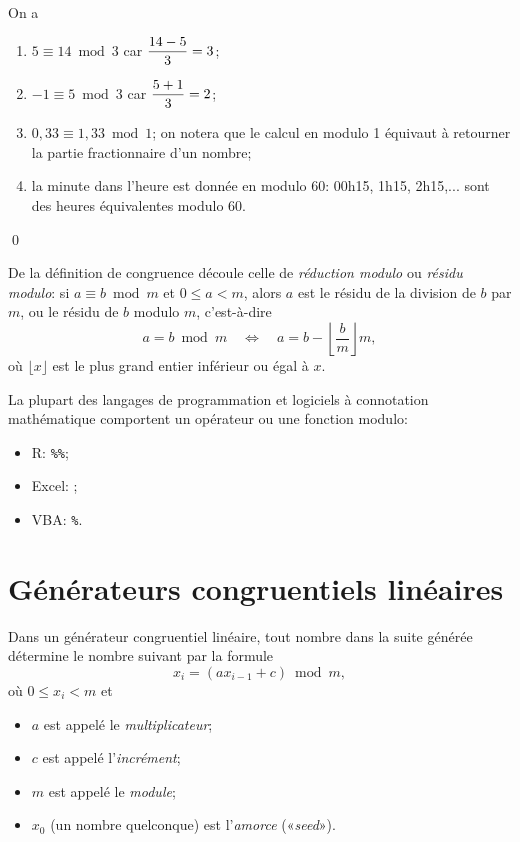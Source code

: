 \begin{exemple}
  On a
  \begin{enumerate}
  \item $5 \equiv 14 \bmod 3$ car $\displaystyle \frac{14 - 5}{3} = 3$;
  \item $-1 \equiv 5 \bmod 3$ car $\displaystyle \frac{5 + 1}{3} = 2$;
  \item $0,33 \equiv 1,33 \bmod 1$; on notera que le calcul en modulo 1
    équivaut à retourner la partie fractionnaire d'un nombre;
  \item la minute dans l'heure est donnée en modulo 60: 00h15, 1h15,
    2h15,... sont des heures équivalentes modulo 60.
  \end{enumerate}
  \qed
\end{exemple}

De la définition de congruence découle celle de \emph{réduction
  modulo} ou \emph{résidu modulo}: si $a \equiv b \bmod m$ et $0 \leq
a < m$, alors $a$ est le résidu de la division de $b$ par $m$, ou le
résidu de $b$ modulo $m$, c'est-à-dire
\begin{equation*}
  a = b \bmod m
  \quad\Leftrightarrow\quad
  a = b - \left\lfloor \frac{b}{m} \right\rfloor m,
\end{equation*}
où $\lfloor x \rfloor$ est le plus grand entier inférieur ou égal à
$x$.

La plupart des langages de programmation et logiciels à connotation
mathématique comportent un opérateur ou une fonction modulo:
\begin{itemize}
\item R: \verb|%%|;
\item Excel: ;
\item VBA: \verb|%|.
\end{itemize}


\section{Générateurs congruentiels linéaires}
\label{sec:generation:congruentiel}

Dans un générateur congruentiel linéaire, tout nombre dans la suite
générée détermine le nombre suivant par la formule
\begin{equation*}
  x_i = (a x_{i - 1} + c) \bmod m,
\end{equation*}
où $0 \leq x_i < m$ et
\begin{itemize}
\item $a$ est appelé le \emph{multiplicateur};
\item $c$ est appelé l'\emph{incrément};
\item $m$ est appelé le \emph{module};
\item $x_0$ (un nombre quelconque) est l'\emph{amorce} («\emph{seed}»).
\end{itemize}

